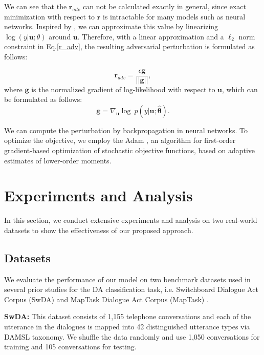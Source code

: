 \documentclass[conference]{IEEEtran}
\begin{document}
	We can see that the $\mathbf{r}_{adv}$ can not be calculated exactly in general, since exact minimization with respect to $\mathbf{r}$ is intractable for many models such as neural networks. Inspired by \cite{goodfellow2015explaining}, we can approximate this value by linearizing $\log (y|\mathbf{u};\theta)$ around $\mathbf{u}$. Therefore, with a linear approximation and a $\ell_2$ norm constraint in Eq.\ref{r_adv}, the resulting adversarial perturbation is formulated as follows:
	
	\begin{equation}
	\mathbf{r}_{adv} = \frac{\epsilon \mathbf{g}}{||\mathbf{g}||},
	\end{equation}
	where $\mathbf{g}$ is the normalized gradient of log-likelihood with respect to $\mathbf{u}$, which can be formulated as follows:
	\begin{equation}
	\mathbf{g}=\nabla_\mathbf{u}\log\ p(y|\mathbf{u};\hat{\mathbf{\theta}}).
	\end{equation}
	
	We can compute the perturbation by backpropagation in neural networks.  
	To optimize the objective, we employ the Adam \cite{kingma2014adam}, an algorithm for first-order gradient-based optimization of stochastic objective functions, based on adaptive estimates of lower-order moments.
	
	\section{Experiments and Analysis}\label{sec_experiments}
	In this section, we conduct extensive experiments and analysis on two real-world datasets to show the effectiveness of our proposed approach. 
	\subsection{Datasets}  
	We evaluate the performance of our model on two benchmark datasets used in several prior studies for the DA classification task, i.e.  Switchboard Dialogue Act Corpus (SwDA) \cite{godfrey1992switchboard} and MapTask Dialogue Act Corpus (MapTask) \cite{anderson1991hcrc}.  %
	
	\textbf{SwDA:} This dataset consists of 1,155 telephone conversations and each of the utterance in the dialogues is mapped into 42 distinguished utterance types via DAMSL taxonomy. We shuffle the data randomly and use 1,050 conversations for training and 105 conversations for testing. %
	
\end{document}
